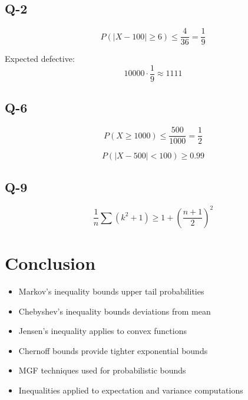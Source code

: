 \documentclass[12pt]{article}
\begin{document}
\subsection*{Q-2}

\[
P(|X - 100| \ge 6) \le \frac{4}{36} = \frac{1}{9}
\]

Expected defective:
\[
10000 \cdot \frac{1}{9} \approx 1111
\]

\subsection*{Q-6}

\[
P(X \ge 1000) \le \frac{500}{1000} = \frac{1}{2}
\]

\[
P(|X - 500| < 100) \ge 0.99
\]

\subsection*{Q-9}

\[
\frac{1}{n} \sum (k^2 + 1) \ge 1 + \left(\frac{n+1}{2}\right)^2
\]

\section*{Conclusion}

\begin{itemize}
\item Markov’s inequality bounds upper tail probabilities
\item Chebyshev’s inequality bounds deviations from mean
\item Jensen’s inequality applies to convex functions
\item Chernoff bounds provide tighter exponential bounds
\item MGF techniques used for probabilistic bounds
\item Inequalities applied to expectation and variance computations
\end{itemize}
\end{document}
